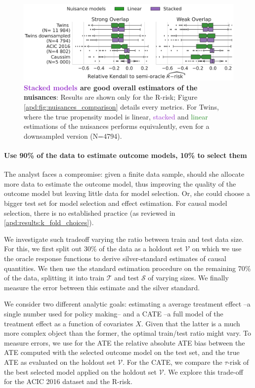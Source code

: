 \documentclass[french,12pt,twoside,a4paper]{book}
\begin{document}
\begin{figure}[!tb]
  \centering
  \includegraphics[width=\linewidth]{img/chapter_5/_4_nuisance_models_r_risk_only_3datasets.pdf}
  \caption{\textbf{\textcolor{DarkOrchid}{Stacked
        models} are good overall estimators of the nuisances}:
    Results are shown only for the
    R-risk; Figure \ref{apd:fig:nuisances_comparison}
    details every metrics. For Twins, where the true propensity
    model is linear, \textcolor{DarkOrchid}{stacked} and
    \textcolor{ForestGreen}{linear}
    estimations of the nuisances performs equivalently, even for a downsampled version
    (N=4794). }\label{fig:all_datasets_nuisances_comparison}
\end{figure}

\paragraph{Use 90\% of the data to estimate outcome models, 10\% to
  select them}

The analyst faces a compromise: given a finite
data sample, should she allocate more data to estimate the outcome model,
thus improving the quality of the outcome model but leaving
little data for model selection. Or, she could choose a bigger test set for
model selection and effect estimation. For causal model selection, there
is no established practice (as reviewed in \ref{apd:results:k_fold_choices}).

We investigate such tradeoff varying the ratio between train and test
data size. For this, we first split out 30\% of the data as a holdout set
$\mathcal{V}$ on which we use the oracle response functions to derive
silver-standard estimates of causal quantities. We then
use the standard estimation procedure on the remaining 70\% of the data,
splitting it into train $\mathcal{T}$ and test $\mathcal{S}$ of varying
sizes. We finally measure the error between this estimate and the
silver standard.

We consider two different analytic goals: estimating a average
treatment effect --a single number used for policy making-- and a
CATE --a full model of the treatment effect as a function of covariates
$X$. Given that the latter is a much more complex object than the former,
the optimal train/test ratio might vary. To measure errors, we use for
the ATE the relative absolute ATE bias between the ATE computed with the
selected outcome model on the test set, and the true ATE as evaluated on
the holdout set $\mathcal{V}$. For the CATE, we compare the
$\tau\text{-risk}$
of the best selected model applied on the holdout set $\mathcal{V}$. We explore this trade-off for the ACIC 2016 dataset and the R-risk.
\end{document}
